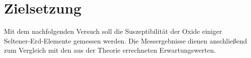 \section{Zielsetzung}
\label{sec:zielsetzung}

Mit dem nachfolgenden Versuch soll die Suszeptibilität der Oxide einiger Seltener-Erd-Elemente gemessen werden. Die
Messergebnisse dienen anschließend zum Vergleich mit den aus der Theorie errechneten Erwartungswerten.

